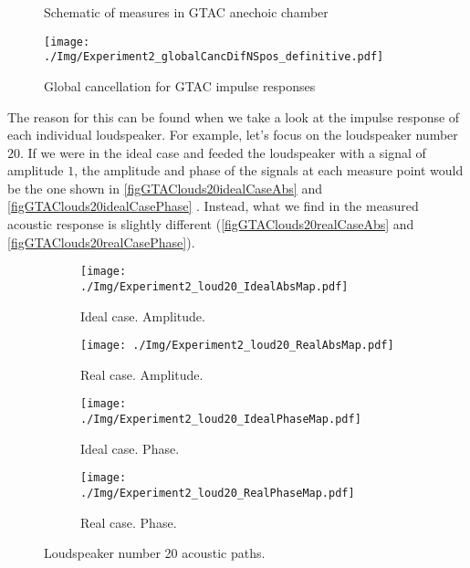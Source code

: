 \begin{figure}[H]
	\begin{minipage}[b]{0.49\textwidth}
		\centering
		\caption[Schematic of measures in GTAC anechoic chamber]{Schematic of measures in GTAC anechoic chamber}
		\label{GTAC360micro}
	\end{minipage}
	\begin{minipage}[b]{0.49\textwidth}
	\centering
	\texttt{[image: ./Img/Experiment2\_globalCancDifNSpos\_definitive.pdf]}	
	\caption[Global cancellation for GTAC impulse responses]{Global cancellation for GTAC impulse responses}
	\label{figGTACglobalCancAlltogether}
\end{minipage}
\end{figure}

The reason for this can be found when we take a look at the impulse response of each individual loudspeaker. For example, let's focus on the loudspeaker number $20$. If we were in the ideal case and feeded the loudspeaker with a signal of amplitude $1$, the amplitude and phase of the signals at each measure point would be the one shown in \autoref{figGTAClouds20idealCaseAbs} and \autoref{figGTAClouds20idealCasePhase} . Instead, what we find in the measured acoustic response is slightly different (\autoref{figGTAClouds20realCaseAbs} and \autoref{figGTAClouds20realCasePhase}).

\begin{figure}[H]
	\centering
	\begin{subfigure}[b]{0.24\textwidth}
		\centering
		\texttt{[image: ./Img/Experiment2\_loud20\_IdealAbsMap.pdf]}
		\caption{Ideal case. Amplitude.}
		\label{figGTAClouds20idealCaseAbs}
	\end{subfigure}
		\begin{subfigure}[b]{0.24\textwidth}
		\centering
		\texttt{[image: ./Img/Experiment2\_loud20\_RealAbsMap.pdf]}
		\caption{Real case. Amplitude.}
		\label{figGTAClouds20realCaseAbs}		
	\end{subfigure}
	\begin{subfigure}[b]{0.24\textwidth}
		\centering
		\texttt{[image: ./Img/Experiment2\_loud20\_IdealPhaseMap.pdf]}
		\caption{Ideal case. Phase.}
		\label{figGTAClouds20idealCasePhase}
	\end{subfigure}
	\begin{subfigure}[b]{0.24\textwidth}
		\centering
		\texttt{[image: ./Img/Experiment2\_loud20\_RealPhaseMap.pdf]}
		\caption{Real case. Phase.}
		\label{figGTAClouds20realCasePhase}
	\end{subfigure}
	\caption{Loudspeaker number 20 acoustic paths.}
	\label{figGTAClouds20}
\end{figure}

